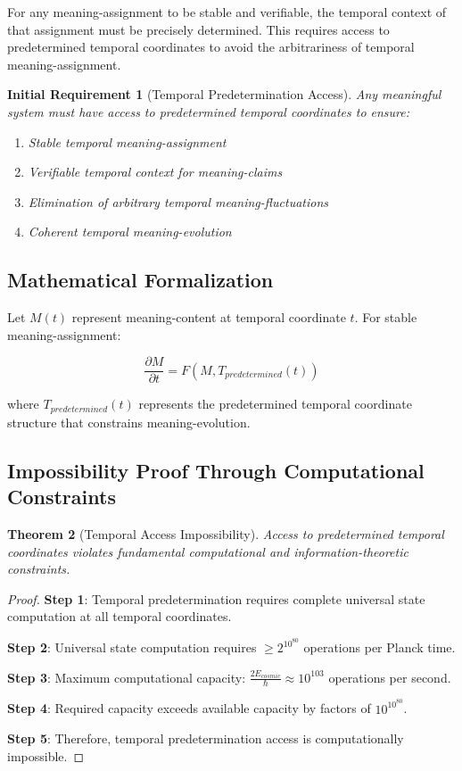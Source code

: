 \documentclass[12pt,a4paper]{article}
\newtheorem{theorem}{Theorem}[section]
\newtheorem{requirement}[theorem]{Initial Requirement}
\begin{document}
For any meaning-assignment to be stable and verifiable, the temporal context of that assignment must be precisely determined. This requires access to predetermined temporal coordinates to avoid the arbitrariness of temporal meaning-assignment.

\begin{requirement}[Temporal Predetermination Access]
Any meaningful system must have access to predetermined temporal coordinates to ensure:
\begin{enumerate}
\item Stable temporal meaning-assignment
\item Verifiable temporal context for meaning-claims
\item Elimination of arbitrary temporal meaning-fluctuations
\item Coherent temporal meaning-evolution
\end{enumerate}
\end{requirement}

\subsection{Mathematical Formalization}

Let $M(t)$ represent meaning-content at temporal coordinate $t$. For stable meaning-assignment:

$$\frac{\partial M}{\partial t} = F(M, T_{predetermined}(t))$$

where $T_{predetermined}(t)$ represents the predetermined temporal coordinate structure that constrains meaning-evolution.

\subsection{Impossibility Proof Through Computational Constraints}

\begin{theorem}[Temporal Access Impossibility]
Access to predetermined temporal coordinates violates fundamental computational and information-theoretic constraints.
\end{theorem}

\begin{proof}
\textbf{Step 1}: Temporal predetermination requires complete universal state computation at all temporal coordinates.

\textbf{Step 2}: Universal state computation requires $\geq 2^{10^{80}}$ operations per Planck time.

\textbf{Step 3}: Maximum computational capacity: $\frac{2E_{cosmic}}{\hbar} \approx 10^{103}$ operations per second.

\textbf{Step 4}: Required capacity exceeds available capacity by factors of $10^{10^{80}}$.

\textbf{Step 5}: Therefore, temporal predetermination access is computationally impossible.
\end{proof}
\end{document}

